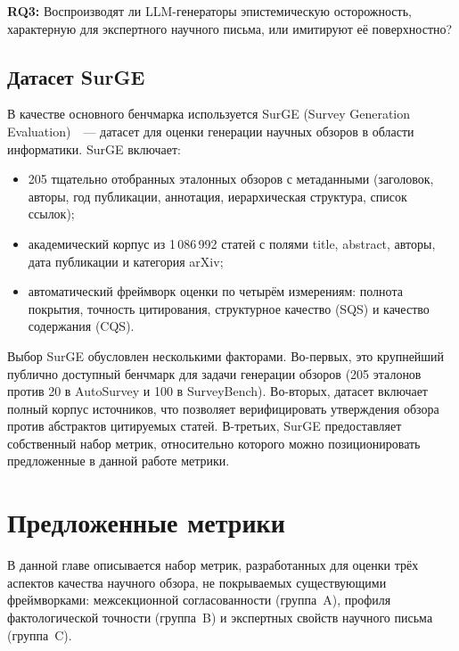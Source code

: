 \documentclass[a4paper,14pt]{extarticle}
\begin{document}
\textbf{RQ3:} Воспроизводят ли LLM-генераторы эпистемическую осторожность, характерную для экспертного научного письма, или имитируют её поверхностно?


\subsection{Датасет SurGE}

В качестве основного бенчмарка используется SurGE (Survey Generation Evaluation)~\cite{su2025surge}~--- датасет для оценки генерации научных обзоров в области информатики. SurGE включает:

\begin{itemize}
    \item 205 тщательно отобранных эталонных обзоров с метаданными (заголовок, авторы, год публикации, аннотация, иерархическая структура, список ссылок);
    \item академический корпус из 1\,086\,992 статей с полями title, abstract, авторы, дата публикации и категория arXiv;
    \item автоматический фреймворк оценки по четырём измерениям: полнота покрытия, точность цитирования, структурное качество (SQS) и качество содержания (CQS).
\end{itemize}

Выбор SurGE обусловлен несколькими факторами. Во-первых, это крупнейший публично доступный бенчмарк для задачи генерации обзоров (205 эталонов против 20 в AutoSurvey и 100 в SurveyBench). Во-вторых, датасет включает полный корпус источников, что позволяет верифицировать утверждения обзора против абстрактов цитируемых статей. В-третьих, SurGE предоставляет собственный набор метрик, относительно которого можно позиционировать предложенные в данной работе метрики.


\newpage

\section{Предложенные метрики}

В данной главе описывается набор метрик, разработанных для оценки трёх аспектов качества научного обзора, не покрываемых существующими фреймворками: межсекционной согласованности (группа~A), профиля фактологической точности (группа~B) и экспертных свойств научного письма (группа~C).
\end{document}
